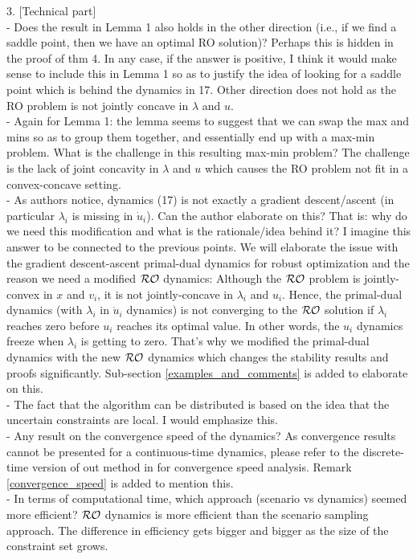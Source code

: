 \documentclass[journal,twoside,web]{ieeecolor}
\begin{document}
3. [Technical part]\\
- Does the result in Lemma 1 also holds in the other direction (i.e., if we find a saddle point, then we have an optimal RO solution)? Perhaps this is hidden in the proof of thm 4. In any case, if the answer is positive, I think it would make sense to include this in Lemma 1 so as to justify the idea of looking for a saddle point which is behind the dynamics in 17. {\color{blue} Other direction does not hold as the RO problem is not jointly concave in $\lambda$ and $u$.}\\
- Again for Lemma 1: the lemma seems to suggest that we can swap the max and mins so as to group them together, and essentially end up with a max-min problem. What is the challenge in this resulting max-min problem? {\color{blue} The challenge is the lack of joint concavity in $\lambda$ and $u$ which causes the RO problem not fit in a convex-concave setting.}\\
- As authors notice, dynamics (17) is not exactly a gradient descent/ascent (in particular $\lambda_i$ is missing in $\dot u_i$). Can the author elaborate on this? That is: why do we need this modification and what is the rationale/idea behind it? I imagine this answer to be connected to the previous points. {\color{blue} We will elaborate the issue with the gradient descent-ascent primal-dual dynamics for robust optimization and the reason we need a modified ${\cal RO}$ dynamics: Although the ${\cal RO}$ problem is jointly-convex in $x$ and $v_i$, it is not jointly-concave in $\lambda_i$ and $u_i$. Hence, the primal-dual dynamics (with $\lambda_i$ in $\dot u_i$ dynamics) is not converging to the $\cal{\cal RO}$ solution if $\lambda_i$ reaches zero before $u_i$ reaches its optimal value. In other words, the $u_i$ dynamics freeze when $\lambda_i$ is getting to zero. That's why we modified the primal-dual dynamics with the new ${\cal RO}$ dynamics which changes the stability results and proofs significantly. Sub-section \ref{examples_and_comments} is added to elaborate on this.}\\
- The fact that the algorithm can be distributed is based on the idea that the uncertain constraints are local. I would emphasize this.\\
- Any result on the convergence speed of the dynamics? {\color{blue} As convergence results cannot be presented for a continuous-time dynamics, please refer to the discrete-time version of out method in \cite{ebrahimi2019} for convergence speed analysis. Remark \ref{convergence_speed} is added to mention this.}\\
{\color{red}- In terms of computational time, which approach (scenario vs dynamics)
seemed more efficient?} {\color{blue} ${\cal RO}$ dynamics is more efficient than the scenario sampling approach. The difference in efficiency gets bigger and bigger as the size of the constraint set grows.}
\end{document}
